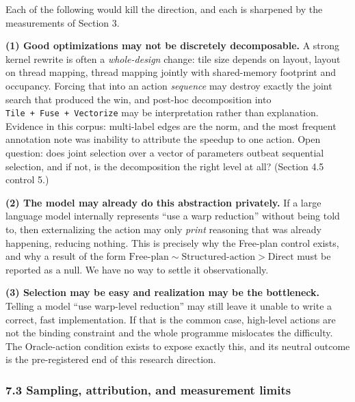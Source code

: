 \documentclass[
  11pt,
]{article}
\begin{document}
Each of the following would kill the direction, and each is sharpened by the measurements of Section 3.

\textbf{(1) Good optimizations may not be discretely decomposable.} A strong kernel rewrite is often a \emph{whole-design} change: tile size depends on layout, layout on thread mapping, thread mapping jointly with shared-memory footprint and occupancy. Forcing that into an action \emph{sequence} may destroy exactly the joint search that produced the win, and post-hoc decomposition into \texttt{Tile\ +\ Fuse\ +\ Vectorize} may be interpretation rather than explanation. Evidence in this corpus: multi-label edges are the norm, and the most frequent annotation note was inability to attribute the speedup to one action. Open question: does joint selection over a vector of parameters outbeat sequential selection, and if not, is the decomposition the right level at all? (Section 4.5 control 5.)

\textbf{(2) The model may already do this abstraction privately.} If a large language model internally represents ``use a warp reduction'' without being told to, then externalizing the action may only \emph{print} reasoning that was already happening, reducing nothing. This is precisely why the Free-plan control exists, and why a result of the form \(\mathrm{Free\text{-}plan} \sim \mathrm{Structured\text{-}action} > \mathrm{Direct}\) must be reported as a null. We have no way to settle it observationally.

\textbf{(3) Selection may be easy and realization may be the bottleneck.} Telling a model ``use warp-level reduction'' may still leave it unable to write a correct, fast implementation. If that is the common case, high-level actions are not the binding constraint and the whole programme mislocates the difficulty. The Oracle-action condition exists to expose exactly this, and its neutral outcome is the pre-registered end of this research direction.

\hypertarget{sampling-attribution-and-measurement-limits}{%
\subsubsection{7.3 Sampling, attribution, and measurement limits}\label{sampling-attribution-and-measurement-limits}}
\end{document}
